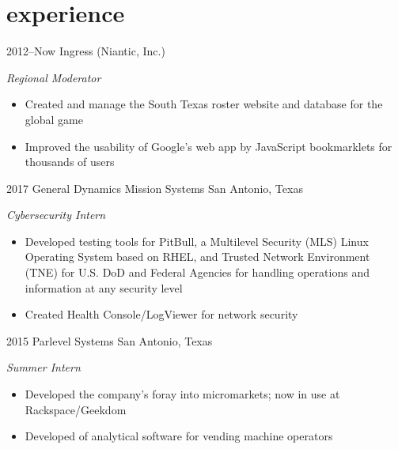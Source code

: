 \documentclass[]{friggeri-cv} %
\begin{document}

\vspace{-7pt}

\section{experience}

\begin{entrylist}

	\entry
	{2012--Now}
	{Ingress (Niantic, Inc.)}
	{}
	{\emph{Regional Moderator}
		\begin{itemize}
			\item Created and manage the South Texas roster website and database for the global game
			\item Improved the usability of Google's web app by JavaScript bookmarklets for thousands of users
		\end{itemize}
	}


	\entry
	{2017}
	{General Dynamics Mission Systems}
	{San Antonio, Texas}
	{\emph{Cybersecurity Intern}
		\begin{itemize}
			\item Developed testing tools for PitBull, a Multilevel Security (MLS) Linux Operating System based on RHEL, and Trusted Network Environment (TNE) for U.S. DoD and Federal Agencies for handling operations and information at any security level
			\item Created Health Console/LogViewer for network security
		\end{itemize}
	}


	\entry
	{2015}
	{Parlevel Systems}
	{San Antonio, Texas}
	{\emph{Summer Intern}
		\begin{itemize}
			\item Developed the company's foray into micromarkets; now in use at Rackspace/Geekdom
			\item Developed of analytical software for vending machine operators
		\end{itemize}
	}

\end{entrylist}

\vspace{-7pt}
\end{document}
